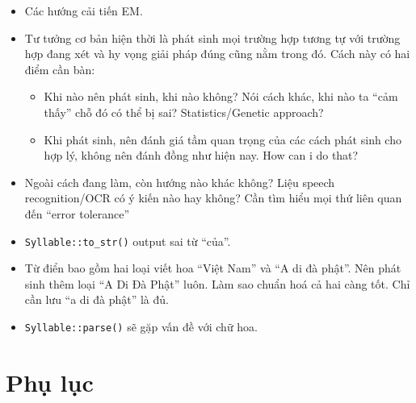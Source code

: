 \documentclass[a4paper,oneside]{book} %
\theoremstyle{break}
\begin{document}
\begin{itemize}
\item Các hướng cải tiến EM.
\item Tư tưởng cơ bản hiện thời là phát sinh mọi trường hợp tương tự
  với trường hợp đang xét và hy vọng giải pháp đúng cũng nằm trong
  đó. Cách này có hai điểm cần bàn:
  \begin{itemize}
  \item Khi nào nên phát sinh, khi nào không? Nói cách khác, khi nào
    ta ``cảm thấy'' chỗ đó có thể bị sai? Statistics/Genetic approach?
  \item Khi phát sinh, nên đánh giá tầm quan trọng của các cách phát
    sinh  cho hợp lý, không nên đánh đồng như hiện nay. How can i do
    that? 
  \end{itemize}
\item Ngoài cách đang làm, còn hướng nào khác không? Liệu speech
  recognition/OCR có ý kiến nào hay không? Cần tìm hiểu mọi thứ liên
  quan đến ``error tolerance''
\item \verb#Syllable::to_str()# output sai từ ``của''.
\item Từ điển bao gồm hai loại viết hoa ``Việt Nam'' và ``A di đà
  phật''. Nên phát sinh thêm loại ``A Di Đà Phật'' luôn. Làm sao chuẩn
  hoá cả hai càng tốt. Chỉ cần lưu ``a di đà phật'' là đủ.
\item \verb#Syllable::parse()# sẽ gặp vấn đề với chữ hoa.
\end{itemize}


\chapter{Phụ lục}
\end{document}
